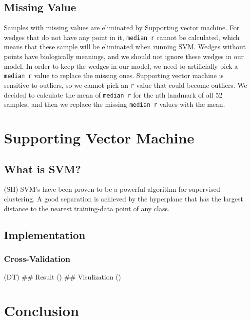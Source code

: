 \documentclass[10pt,letterpaper]{article}
\begin{document}
\subsection{Missing Value}\label{missing-value}

Samples with missing values are eliminated by Supporting vector machine.
For wedges that do not have any point in it, \texttt{median\ r} cannot
be calculated, which means that these sample will be eliminated when
running SVM. Wedges without points have biologically meanings, and we
should not ignore these wedges in our model. In order to keep the wedges
in our model, we need to artificially pick a \texttt{median\ r} value to
replace the missing ones. Supporting vector machine is sensitive to
outliers, so we cannot pick an \texttt{r} value that could become
outliers. We decided to calculate the mean of \texttt{median\ r} for the
nth landmark of all 52 samples, and then we replace the missing
\texttt{median\ r} values with the mean.

\section{Supporting Vector Machine}\label{supporting-vector-machine}

\subsection{What is SVM?}\label{what-is-svm}

(SH) SVM's have been proven to be a powerful algorithm for supervised
clustering. A good separation is achieved by the hyperplane that has the
largest distance to the nearest training-data point of any class.

\subsection{Implementation}\label{implementation}

\subsubsection{Cross-Validation}\label{cross-validation}

(DT) \#\# Result () \#\# Visulization ()

\section{Conclusion}\label{conclusion}
\end{document}
